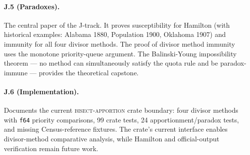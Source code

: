 \paragraph{J.5 (Paradoxes).}
The central paper of the J-track.
It proves susceptibility for Hamilton (with historical examples:
Alabama 1880, Population 1900, Oklahoma 1907) and immunity for all
four divisor methods.
The proof of divisor method immunity uses the monotone priority-queue
argument.
The Balinski-Young impossibility theorem \citep{balinski1982fair}
--- no method can simultaneously satisfy the quota rule and be
paradox-immune --- provides the theoretical capstone.

\paragraph{J.6 (Implementation).}
Documents the current \textsc{bisect-apportion} crate boundary:
four divisor methods with \texttt{f64} priority comparisons, 99 crate tests,
24 apportionment/paradox tests, and missing Census-reference fixtures.
The crate's current interface enables divisor-method comparative analysis,
while Hamilton and official-output verification remain future work.

